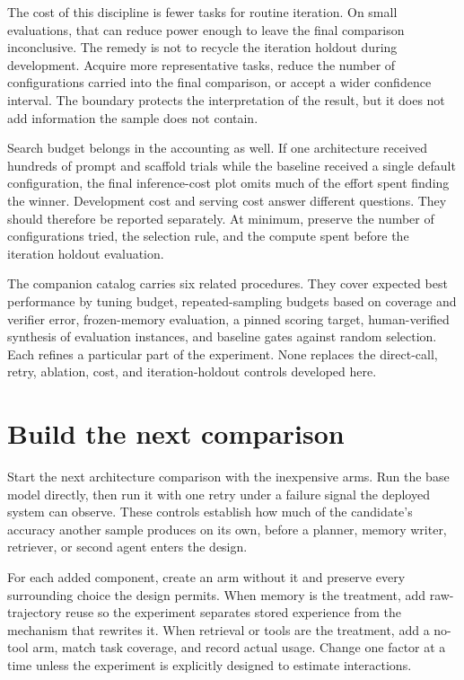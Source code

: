 The cost of this discipline is fewer tasks for routine iteration. On small evaluations, that can reduce power enough to leave the final comparison inconclusive. The remedy is not to recycle the iteration holdout during development. Acquire more representative tasks, reduce the number of configurations carried into the final comparison, or accept a wider confidence interval. The boundary protects the interpretation of the result, but it does not add information the sample does not contain.

Search budget belongs in the accounting as well. If one architecture received hundreds of prompt and scaffold trials while the baseline received a single default configuration, the final inference-cost plot omits much of the effort spent finding the winner. Development cost and serving cost answer different questions. They should therefore be reported separately. At minimum, preserve the number of configurations tried, the selection rule, and the compute spent before the iteration holdout evaluation.

The companion catalog carries six related procedures. They cover expected best performance by tuning budget, repeated-sampling budgets based on coverage and verifier error, frozen-memory evaluation, a pinned scoring target, human-verified synthesis of evaluation instances, and baseline gates against random selection. Each refines a particular part of the experiment. None replaces the direct-call, retry, ablation, cost, and iteration-holdout controls developed here.

\section{Build the next comparison}\label{build-the-next-comparison}

Start the next architecture comparison with the inexpensive arms. Run the base model directly, then run it with one retry under a failure signal the deployed system can observe. These controls establish how much of the candidate's accuracy another sample produces on its own, before a planner, memory writer, retriever, or second agent enters the design.

For each added component, create an arm without it and preserve every surrounding choice the design permits. When memory is the treatment, add raw-trajectory reuse so the experiment separates stored experience from the mechanism that rewrites it. When retrieval or tools are the treatment, add a no-tool arm, match task coverage, and record actual usage. Change one factor at a time unless the experiment is explicitly designed to estimate interactions.

